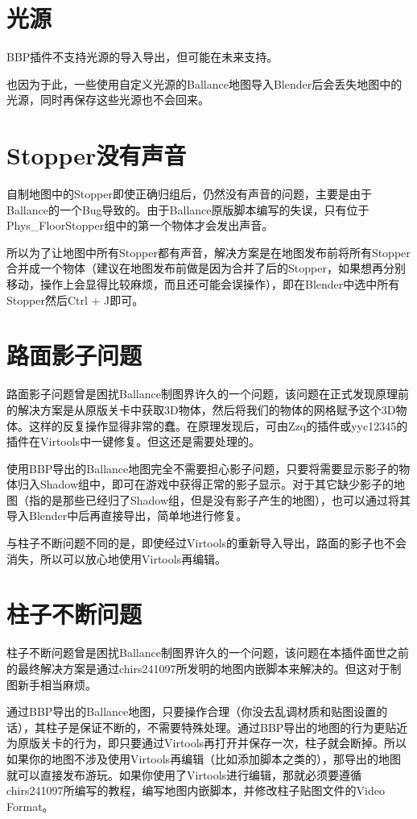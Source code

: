 \section{光源}

BBP插件不支持光源的导入导出，但可能在未来支持。

也因为于此，一些使用自定义光源的Ballance地图导入Blender后会丢失地图中的光源，同时再保存这些光源也不会回来。

\section{Stopper没有声音}

自制地图中的Stopper即使正确归组后，仍然没有声音的问题，主要是由于Ballance的一个Bug导致的。由于Ballance原版脚本编写的失误，只有位于Phys\_FloorStopper组中的第一个物体才会发出声音。

所以为了让地图中所有Stopper都有声音，解决方案是在地图发布前将所有Stopper合并成一个物体（建议在地图发布前做是因为合并了后的Stopper，如果想再分别移动，操作上会显得比较麻烦，而且还可能会误操作），即在Blender中选中所有Stopper然后Ctrl + J即可。

\section{路面影子问题}

路面影子问题曾是困扰Ballance制图界许久的一个问题，该问题在正式发现原理前的解决方案是从原版关卡中获取3D物体，然后将我们的物体的网格赋予这个3D物体。这样的反复操作显得非常的蠢。在原理发现后，可由Zzq的插件或yyc12345的插件在Virtools中一键修复。但这还是需要处理的。

使用BBP导出的Ballance地图完全不需要担心影子问题，只要将需要显示影子的物体归入Shadow组中，即可在游戏中获得正常的影子显示。对于其它缺少影子的地图（指的是那些已经归了Shadow组，但是没有影子产生的地图），也可以通过将其导入Blender中后再直接导出，简单地进行修复。

与柱子不断问题不同的是，即使经过Virtools的重新导入导出，路面的影子也不会消失，所以可以放心地使用Virtools再编辑。

\section{柱子不断问题}

柱子不断问题曾是困扰Ballance制图界许久的一个问题，该问题在本插件面世之前的最终解决方案是通过chirs241097所发明的地图内嵌脚本来解决的。但这对于制图新手相当麻烦。

通过BBP导出的Ballance地图，只要操作合理（你没去乱调材质和贴图设置的话），其柱子是保证不断的，不需要特殊处理。通过BBP导出的地图的行为更贴近为原版关卡的行为，即只要通过Virtools再打开并保存一次，柱子就会断掉。所以如果你的地图不涉及使用Virtools再编辑（比如添加脚本之类的），那导出的地图就可以直接发布游玩。如果你使用了Virtools进行编辑，那就必须要遵循chirs241097所编写的教程，编写地图内嵌脚本，并修改柱子贴图文件的Video Format。

